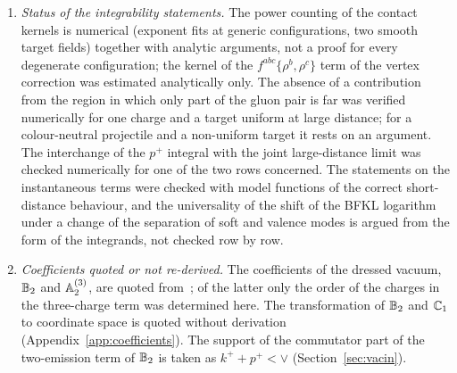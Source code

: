 \begin{enumerate}
\item[(vii)] \emph{Status of the integrability statements.} The power counting of the contact kernels is numerical (exponent fits at generic configurations, two smooth target fields) together with analytic arguments, not a proof for every degenerate configuration; the kernel of the $f^{abc}\{\rho^b,\rho^c\}$ term of the vertex correction was estimated analytically only. The absence of a contribution from the region in which only part of the gluon pair is far was verified numerically for one charge and a target uniform at large distance; for a colour-neutral projectile and a non-uniform target it rests on an argument. The interchange of the $p^+$ integral with the joint large-distance limit was checked numerically for one of the two rows concerned. The statements on the instantaneous terms were checked with model functions of the correct short-distance behaviour, and the universality of the shift of the BFKL logarithm under a change of the separation of soft and valence modes is argued from the form of the integrands, not checked row by row.
\item[(viii)] \emph{Coefficients quoted or not re-derived.} The coefficients of the dressed vacuum, $\mathbb{B}_2$ and $\mathbb{A}^{(3)}_2$, are quoted from~\cite{Lublinsky:2016meo}; of the latter only the order of the charges in the three-charge term was determined here. The transformation of $\mathbb{B}_2$ and $\mathbb{C}_1$ to coordinate space is quoted without derivation (Appendix~\ref{app:coefficients}). The support of the commutator part of the two-emission term of $\mathbb{B}_2$ is taken as $k^++p^+<\vee$ (Section~\ref{sec:vacin}).
\end{enumerate}

